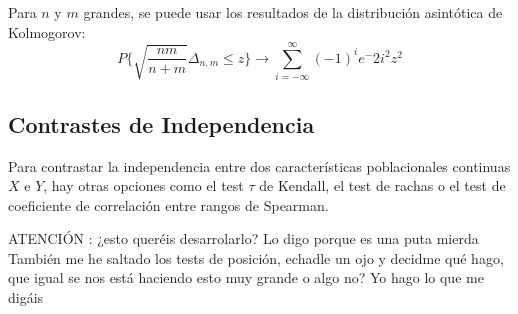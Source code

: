 \documentclass[a4paper,12pt]{article}
\begin{document}
Para $n$ y $m$ grandes, se puede usar los resultados de la distribución asintótica de Kolmogorov:
$$P\{ \sqrt{\frac{nm}{n+m}}\Delta_{n,m}\leq z\}\longrightarrow \sum^{\infty}_{i=-\infty}(-1)^i e^-2i^2z^2$$


\subsection{Contrastes de Independencia}
Para contrastar la independencia entre dos características poblacionales continuas $X$ e $Y$, hay otras opciones como el test $\tau$ de Kendall, el test de rachas o el test de coeficiente de correlación entre rangos de Spearman.

ATENCIÓN : ¿esto queréis desarrolarlo? Lo digo porque es una puta mierda\\
También me he saltado los tests de posición, echadle un ojo y decidme qué hago, que igual se nos está haciendo esto muy grande o algo no? Yo hago lo que me digáis








































\end{document}
